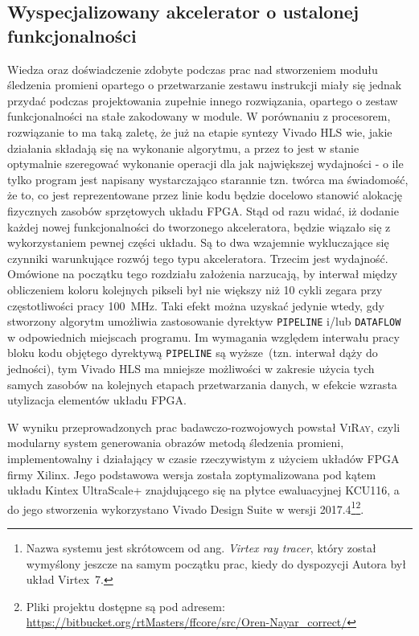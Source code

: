 \subsection{Wyspecjalizowany akcelerator o ustalonej funkcjonalności}
Wiedza oraz doświadczenie zdobyte podczas prac nad stworzeniem modułu śledzenia promieni opartego o przetwarzanie zestawu instrukcji miały się jednak przydać podczas projektowania zupełnie innego rozwiązania, opartego o zestaw funkcjonalności na stałe zakodowany w module. W porównaniu z procesorem, rozwiązanie to ma taką zaletę, że już na etapie syntezy Vivado HLS wie, jakie działania składają się na wykonanie algorytmu, a przez to jest w stanie optymalnie szeregować wykonanie operacji dla jak największej wydajności - o ile tylko program jest napisany wystarczająco starannie tzn. twórca ma świadomość, że to, co jest reprezentowane przez linie kodu będzie docelowo stanowić alokację fizycznych zasobów sprzętowych układu FPGA. Stąd od razu widać, iż dodanie każdej nowej funkcjonalności do tworzonego akceleratora, będzie wiązało się z wykorzystaniem pewnej części układu. Są to dwa wzajemnie wykluczające się czynniki warunkujące rozwój tego typu akceleratora. Trzecim jest wydajność. Omówione na początku tego rozdziału założenia narzucają, by interwał między obliczeniem koloru kolejnych pikseli był nie większy niż 10 cykli zegara przy częstotliwości pracy 100~MHz. Taki efekt można uzyskać jedynie wtedy, gdy stworzony algorytm umożliwia zastosowanie dyrektyw \texttt{PIPELINE} i/lub \texttt{DATAFLOW} w odpowiednich miejscach programu. Im wymagania względem interwału pracy bloku kodu objętego dyrektywą \texttt{PIPELINE} są wyższe~(tzn. interwał dąży do jedności), tym  Vivado HLS ma mniejsze możliwości w zakresie użycia tych samych zasobów na kolejnych etapach przetwarzania danych, w efekcie wzrasta utylizacja elementów układu FPGA.

W wyniku przeprowadzonych prac badawczo-rozwojowych powstał \textsc{ViRay}, czyli modularny system generowania obrazów metodą śledzenia promieni, implementowalny i działający w czasie rzeczywistym z użyciem układów FPGA firmy Xilinx. Jego podstawowa wersja została zoptymalizowana pod kątem układu  Kintex UltraScale+ znajdującego się na płytce ewaluacyjnej KCU116, a do jego stworzenia wykorzystano Vivado Design Suite w wersji 2017.4\footnote{Nazwa systemu jest skrótowcem od ang. \textit{Virtex ray tracer}, który został wymyślony jeszcze na samym początku prac, kiedy do dyspozycji Autora był układ Virtex~7.}\footnote{Pliki projektu dostępne są pod adresem: \url{https://bitbucket.org/rtMasters/ffcore/src/Oren-Nayar_correct/}}.

